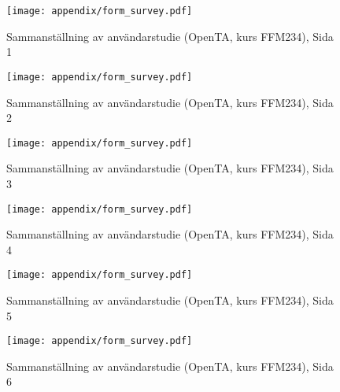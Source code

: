 

\begin{figure}[H]
    \centering
    \texttt{[image: appendix/form\_survey.pdf]}
    \caption*{Sammanställning av användarstudie (OpenTA, kurs FFM234), Sida 1}
    \label{fig:openform1}
\end{figure}


\begin{figure}[H]
    \centering
    \texttt{[image: appendix/form\_survey.pdf]}
    \caption*{Sammanställning av användarstudie (OpenTA, kurs FFM234), Sida 2}
    \label{fig:openform2}
\end{figure}


\begin{figure}[H]
    \centering
    \texttt{[image: appendix/form\_survey.pdf]}
    \caption*{Sammanställning av användarstudie (OpenTA, kurs FFM234), Sida 3}
    \label{fig:openform3}
\end{figure}

\begin{figure}[H]
    \centering
    \texttt{[image: appendix/form\_survey.pdf]}
    \caption*{Sammanställning av användarstudie (OpenTA, kurs FFM234), Sida 4}
    \label{fig:openform4}
\end{figure}

\begin{figure}[H]
    \centering
    \texttt{[image: appendix/form\_survey.pdf]}
    \caption*{Sammanställning av användarstudie (OpenTA, kurs FFM234), Sida 5}
    \label{fig:openform5}
\end{figure}

\begin{figure}[H]
    \centering
    \texttt{[image: appendix/form\_survey.pdf]}
    \caption*{Sammanställning av användarstudie (OpenTA, kurs FFM234), Sida 6}
    \label{fig:openfor6}
\end{figure}

